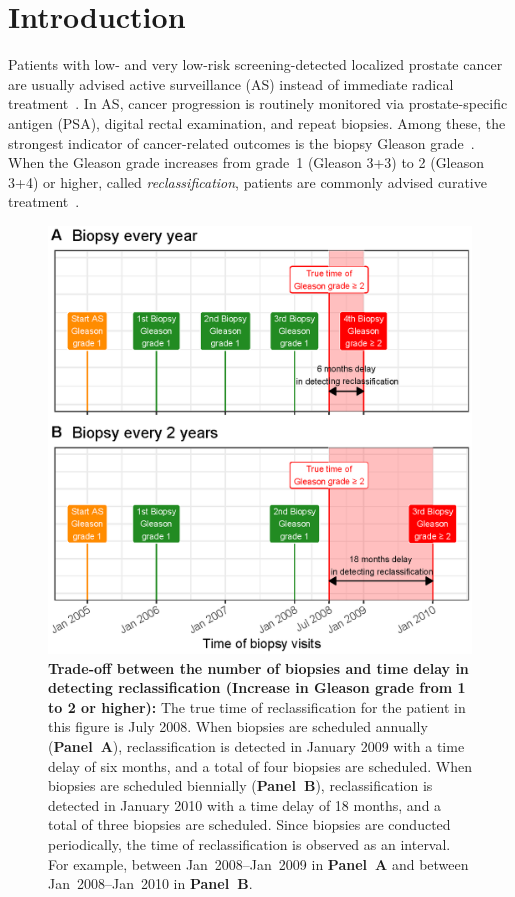 \section{Introduction}
Patients with low- and very low-risk screening-detected localized prostate cancer are usually advised active surveillance (AS) instead of immediate radical treatment~\citep{briganti2018active}. In AS, cancer progression is routinely monitored via prostate-specific antigen (PSA), digital rectal examination, and repeat biopsies. Among these, the strongest indicator of cancer-related outcomes is the biopsy Gleason grade~\citep{epsteinGG2014}. When the Gleason grade increases from grade~1 (Gleason 3+3) to 2 (Gleason 3+4) or higher, called \textit{reclassification}, patients are commonly advised curative treatment~\citep{bul2013active}.

\begin{figure}
\centerline{\includegraphics[width=\columnwidth]{images/delay_explanation.eps}}
\caption{\textbf{Trade-off between the number of biopsies and time delay in detecting reclassification (Increase in Gleason grade from 1 to 2 or higher):} The true time of reclassification for the patient in this figure is July 2008. When biopsies are scheduled annually (\textbf{Panel~A}), reclassification is detected in January 2009 with a time delay of six months, and a total of four biopsies are scheduled. When biopsies are scheduled biennially (\textbf{Panel~B}), reclassification is detected in January 2010 with a time delay of 18 months, and a total of three biopsies are scheduled. Since biopsies are conducted periodically, the time of reclassification is observed as an interval. For example, between Jan~2008--Jan~2009 in \textbf{Panel~A} and between Jan~2008--Jan~2010 in \textbf{Panel~B}.}
\label{fig:delay_explanation}
\end{figure}

